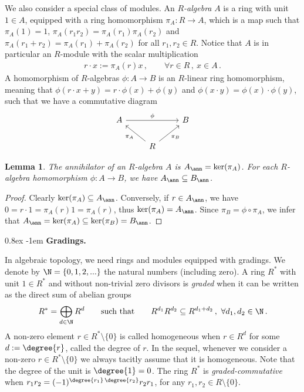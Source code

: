 \documentclass[11pt,a4paper,reqno]{article}
\makeatletter
\renewcommand{\paragraph}{%
  \@startsection{paragraph}{4}{\z@}%
  {0.8ex}  %
  {-1em}   %
  {\normalfont\bfseries}%
}
\numberwithin{equation}{section}
\newtheorem{lemma}[theorem]{Lemma}
\theoremstyle{definition}
\makeatother
\begin{document}
We also consider a special class of modules. An \emph{$R$-algebra} $A$ is a ring with unit $1\in A$, equipped with a ring homomorphism $\pi_A:R\to A$, which is a map such that $ \pi_A (1) = 1 $,  $\pi_A(r_1r_2)=\pi_A(r_1)\pi_A(r_2)$ and $\pi_A(r_1+r_2)=\pi_A(r_1)+\pi_A(r_2)$ for all $r_1,r_2\in R$. Notice that $A$ is in particular an $R$-module with the scalar multiplication
\begin{align*}
r\cdot x:=\pi_A(r)x \, ,\qquad\forall r\in R \, ,\ x\in A \, .
\end{align*}
A homomorphism of $R$-algebras $\phi:A\to B$ is an $R$-linear ring homomorphism, meaning that $\phi(r\cdot x+y)=r\cdot\phi(x)+\phi(y)$ and 
$ \phi(x \cdot y)=\phi(x) \cdot \phi(y) $, such that we have a commutative diagram
\[
\begin{tikzcd}
 A
 \arrow[rr, "\phi"]
 & & 
 B
 \\
 & 
 R \arrow[ul, "\pi_A"]\arrow[ur, "\pi_B"']
 & 
\end{tikzcd}
\]
\begin{lemma}\label{p:algebras}
The annihilator of an $R$-algebra $A$ is 
$ A_\ann=\ker(\pi_A) $. 
For each $R$-algebra homomorphism $\phi:A\to B$, we have 
$ A_\ann\subseteq B_\ann $. 
\end{lemma}

\begin{proof}
Clearly $\ker(\pi_A)\subseteq A_\ann$. 
Conversely, if $r\in A_\ann$, we have 
$ 0=r\cdot1=\pi_A(r)1=\pi_A(r) $, 
thus $\ker(\pi_A)=A_\ann$. Since 
$\pi_B=\phi\circ\pi_A$, we infer that 
$ A_\ann=\ker(\pi_A)\subseteq\ker(\pi_B)=B_\ann $. \qedhere
\end{proof}





\paragraph{\bf Gradings.}\label{ss:gradings}

In  algebraic topology, we  need rings and modules equipped with gradings. We denote by $\N=\{0,1,2,...\}$ the natural numbers (including zero). A ring $R^*$ with unit $1\in R^*$ and without non-trivial zero divisors is \emph{graded} when it can be written as the direct sum of abelian groups
\begin{align*}
R^*=\bigoplus_{d\in\N} R^d \qquad
\text{such that} \qquad R^{d_1}R^{d_2}\subseteq R^{d_1+d_2} \, , \ \forall  d_1,d_2\in\N \, . 
\end{align*}
 A non-zero element $r\in R^*\setminus\{0\}$ is called homogeneous when $r\in R^d$ for some $d := \degree{r}$, called the degree of $ r$. 
In the sequel, whenever we consider a non-zero  $r\in R^*\setminus\{0\}$ we always tacitly assume that it is homogeneous.
Note that the degree of the unit is $\degree{1}=0$. The ring $R^*$ is \emph{graded-commutative} when
$ r_1r_2=(-1)^{\degree{r_1}\,\degree{r_2}}r_2r_1 $, for any  $ r_1,r_2\in R\setminus\{0\} $.
\end{document}
